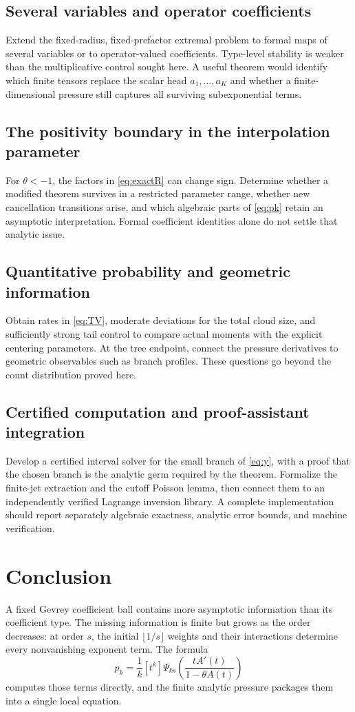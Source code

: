\documentclass[11pt,a4paper]{article}
\theoremstyle{definition}
\theoremstyle{remark}
\numberwithin{equation}{section}
\begin{document}
\subsection{Several variables and operator coefficients}
Extend the fixed-radius, fixed-prefactor extremal problem to formal
maps of several variables or to operator-valued coefficients.
Type-level stability is weaker than the multiplicative control sought
here. A useful theorem would identify which finite tensors replace the
scalar head $a_1,\ldots,a_K$ and whether a finite-dimensional pressure
still captures all surviving subexponential terms.

\subsection{The positivity boundary in the interpolation parameter}
For $\theta<-1$, the factors in \eqref{eq:exactR} can change sign.
Determine whether a modified theorem survives in a restricted parameter
range, whether new cancellation transitions arise, and which algebraic
parts of \eqref{eq:pk} retain an asymptotic interpretation. Formal
coefficient identities alone do not settle that analytic issue.

\subsection{Quantitative probability and geometric information}
Obtain rates in \eqref{eq:TV}, moderate deviations for the total cloud
size, and sufficiently strong tail control to compare actual moments
with the explicit centering parameters. At the tree endpoint, connect
the pressure derivatives to geometric observables such as branch
profiles. These questions go beyond the count distribution proved here.

\subsection{Certified computation and proof-assistant integration}
Develop a certified interval solver for the small branch of
\eqref{eq:y}, with a proof that the chosen branch is the analytic germ
required by the theorem. Formalize the finite-jet extraction and the
cutoff Poisson lemma, then connect them to an independently verified
Lagrange inversion library. A complete implementation should report
separately algebraic exactness, analytic error bounds, and machine
verification.

\section{Conclusion}
A fixed Gevrey coefficient ball contains more asymptotic information
than its coefficient type. The missing information is finite but grows
as the order decreases: at order $s$, the initial
$\lfloor1/s\rfloor$ weights and their interactions determine every
nonvanishing exponent term. The formula
\[
 p_k=\frac1k[t^k]\Psi_{ks}\!\left(\frac{tA'(t)}{1-\theta A(t)}\right)
\]
computes those terms directly, and the finite analytic pressure
packages them into a single local equation.
\end{document}
